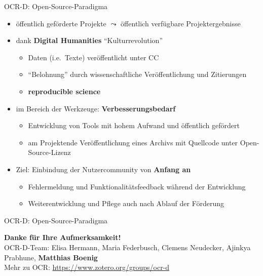 \documentclass{bbawslides}
\begin{document}
\begin{bbawslide}{OCR-D: Open-Source-Paradigma}
  \vspace*{2mm}%
  \centerslidestrue%
  \begin{itemize}
    \item öffentlich geförderte Projekte $\leadsto$ öffentlich verfügbare Projektergebnisse
    \item dank \textbf{Digital Humanities} \enquote{Kulturrevolution}
    \begin{itemize}\small
      \item Daten (i.e.~Texte) veröffentlicht unter CC
      \item \enquote{Belohnung} durch wissenschaftliche Veröffentlichung und Zitierungen
      \item \textbf{reproducible science}
    \end{itemize}
    \item im Bereich der Werkzeuge: \textbf{Verbesserungsbedarf}
    \begin{itemize}\small
      \item Entwicklung von Tools mit hohem Aufwand und öffentlich gefördert
      \item am Projektende Veröffentlichung eines Archivs mit Quellcode unter Open-Source-Lizenz
    \end{itemize}
    \item Ziel: Einbindung der Nutzercommunity von \textbf{Anfang an}
    \begin{itemize}\small
      \item Fehlermeldung und Funktionalitätsfeedback während der Entwicklung
      \item Weiterentwicklung und Pflege auch nach Ablauf der Förderung
    \end{itemize}
  \end{itemize}
\end{bbawslide}

\begin{bbawslide}{OCR-D: Open-Source-Paradigma}
  \vspace*{2mm}%
  \begin{center}
  \end{center}
\end{bbawslide}

\begin{bbawpart}{\Large\bf Danke für Ihre Aufmerksamkeit!\\}
OCR-D-Team: Elisa Hermann, Maria Federbusch, Clemens Neudecker, Ajinkya Prabhune, \textbf{Matthias Boenig}\\
Mehr zu OCR: \url{https://www.zotero.org/groups/ocr-d}
\end{bbawpart}
\end{document}
